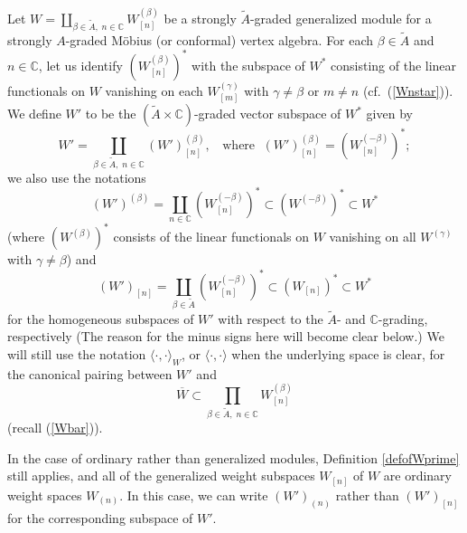 \documentclass[12pt]{article}
\begin{document}
\begin{defi}\label{defofWprime}{\rm
Let $W=\coprod_{\beta \in \tilde A,\;n\in{\mathbb C}}W^{(\beta)}_{[n]}$
be a strongly $\tilde A$-graded generalized module for a strongly
$A$-graded M\"obius (or conformal) vertex algebra.  For each $\beta\in
\tilde A$ and $n \in {\mathbb C}$, let us identify
$(W^{(\beta)}_{[n]})^*$ with the subspace of $W^*$ consisting of the
linear functionals on $W$ vanishing on each $W^{(\gamma)}_{[m]}$ with
$\gamma \neq \beta$ or $m \neq n$ (cf.\ (\ref{Wnstar})).  We define
$W'$ to be the $(\tilde A\times{\mathbb C})$-graded vector subspace of
$W^*$ given by
\begin{equation}
W'=\coprod_{\beta \in \tilde A,\; n\in{\mathbb C}}
(W')^{(\beta)}_{[n]}, \;\;\mbox{ where }\;
(W')^{(\beta)}_{[n]}=(W^{(-\beta)}_{[n]})^*;
\end{equation}
we also use the notations
\begin{equation}\label{W'beta}
(W')^{(\beta)}=\coprod_{n\in{\mathbb C}}(W^{(-\beta)}_{[n]})^*
\subset(W^{(-\beta)})^* \subset W^*
\end{equation}
(where $(W^{(\beta)})^*$ consists of the linear functionals on $W$
vanishing on all $W^{(\gamma)}$ with $\gamma \neq \beta$) and
\begin{equation}
(W')_{[n]}=\coprod_{\beta\in\tilde A}(W^{(-\beta)}_{[n]})^*
\subset(W_{[n]})^* \subset W^*
\end{equation}
for the homogeneous subspaces of $W'$ with respect to the $\tilde A$-
and ${\mathbb C}$-grading, respectively (The reason for the minus
signs here will become clear below.)  We will still use the notation
$\langle\cdot,\cdot\rangle_W$, or $\langle\cdot,\cdot\rangle$ when the
underlying space is clear, for the canonical pairing between $W'$ and
\[
\overline{W}\subset \prod_{\beta \in \tilde A,\; n\in{\mathbb
C}}W^{(\beta)}_{[n]}
\]
(recall (\ref{Wbar})).  }
\end{defi}

\begin{rema}{\rm
In the case of ordinary rather than generalized modules, Definition
\ref{defofWprime} still applies, and all of the generalized weight
subspaces $W_{[n]}$ of $W$ are ordinary weight spaces $W_{(n)}$.  In
this case, we can write $(W')_{(n)}$ rather than $(W')_{[n]}$ for the
corresponding subspace of $W'$.}
\end{rema}
\end{document}
